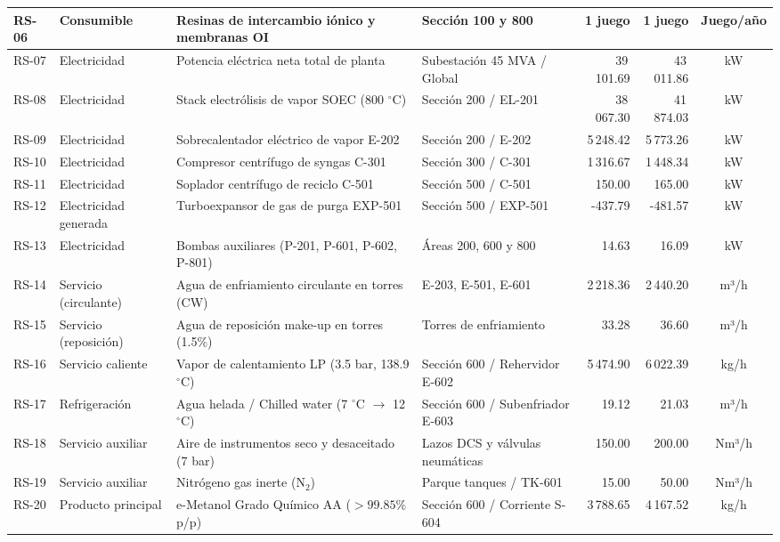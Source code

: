 \documentclass[10pt,letterpaper]{article}
\begin{document}
\begin{landscape}
\begin{xltabular}{\linewidth}{|l|p{3.2cm}|p{5.5cm}|p{3.5cm}|r|r|c|}
RS-06 & Consumible & Resinas de intercambio iónico y membranas OI & Sección 100 y 800 & 1 juego & 1 juego & Juego/año \\ \hline
RS-07 & Electricidad & Potencia eléctrica neta total de planta & Subestación 45 MVA / Global & 39\,101.69 & 43\,011.86 & kW \\ \hline
RS-08 & Electricidad & Stack electrólisis de vapor SOEC (800 $^\circ$C) & Sección 200 / EL-201 & 38\,067.30 & 41\,874.03 & kW \\ \hline
RS-09 & Electricidad & Sobrecalentador eléctrico de vapor E-202 & Sección 200 / E-202 & 5\,248.42 & 5\,773.26 & kW \\ \hline
RS-10 & Electricidad & Compresor centrífugo de syngas C-301 & Sección 300 / C-301 & 1\,316.67 & 1\,448.34 & kW \\ \hline
RS-11 & Electricidad & Soplador centrífugo de reciclo C-501 & Sección 500 / C-501 & 150.00 & 165.00 & kW \\ \hline
RS-12 & Electricidad generada & Turboexpansor de gas de purga EXP-501 & Sección 500 / EXP-501 & -437.79 & -481.57 & kW \\ \hline
RS-13 & Electricidad & Bombas auxiliares (P-201, P-601, P-602, P-801) & Áreas 200, 600 y 800 & 14.63 & 16.09 & kW \\ \hline
RS-14 & Servicio (circulante) & Agua de enfriamiento circulante en torres (CW) & E-203, E-501, E-601 & 2\,218.36 & 2\,440.20 & m³/h \\ \hline
RS-15 & Servicio (reposición) & Agua de reposición make-up en torres (1.5\%) & Torres de enfriamiento & 33.28 & 36.60 & m³/h \\ \hline
RS-16 & Servicio caliente & Vapor de calentamiento LP (3.5 bar, 138.9 $^\circ$C) & Sección 600 / Rehervidor E-602 & 5\,474.90 & 6\,022.39 & kg/h \\ \hline
RS-17 & Refrigeración & Agua helada / Chilled water (7 $^\circ$C $\to$ 12 $^\circ$C) & Sección 600 / Subenfriador E-603 & 19.12 & 21.03 & m³/h \\ \hline
RS-18 & Servicio auxiliar & Aire de instrumentos seco y desaceitado (7 bar) & Lazos DCS y válvulas neumáticas & 150.00 & 200.00 & Nm³/h \\ \hline
RS-19 & Servicio auxiliar & Nitrógeno gas inerte ($\text{N}_2$) & Parque tanques / TK-601 & 15.00 & 50.00 & Nm³/h \\ \hline
RS-20 & Producto principal & e-Metanol Grado Químico AA ($>99.85\%$ p/p) & Sección 600 / Corriente S-604 & 3\,788.65 & 4\,167.52 & kg/h \\ \hline

\end{xltabular}
\end{landscape}
\end{document}
